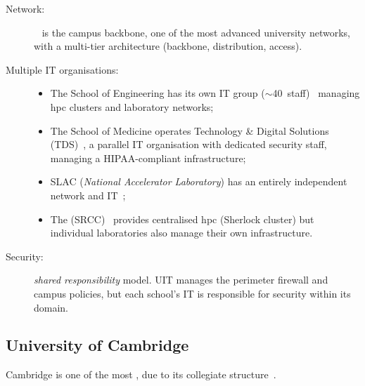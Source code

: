\begin{description}
    \item[Network:] ~\cite{stanford-sunet} is the
    campus backbone, one of the most advanced university networks, with a
    multi-tier architecture (backbone, distribution, access).
    \item[Multiple IT organisations:]
    \begin{itemize}[nosep]
        \item The School of Engineering has its own IT group
        ($\sim$40~staff)~\cite{stanford-soe-it} managing \gls{hpc} clusters
        and laboratory networks;
        \item The School of Medicine operates Technology \& Digital
        Solutions (TDS)~\cite{stanford-som}, a parallel IT organisation
        with dedicated security staff, managing a HIPAA-compliant infrastructure;
        \item SLAC (\emph{National Accelerator Laboratory}) has an
        entirely independent network and IT~\cite{stanford-slac};
        \item The 
        (SRCC)~\cite{stanford-srcc} provides centralised \gls{hpc} (Sherlock
        cluster) but individual laboratories also manage their own
        infrastructure.
    \end{itemize}
    \item[Security:] \emph{shared responsibility} model. UIT manages the
    perimeter firewall and campus policies, but each school's IT is
    responsible for security within its domain.
\end{description}

\subsection{University of Cambridge}

Cambridge is one of the most , due to its collegiate
structure~\cite{cambridge-structure}.

